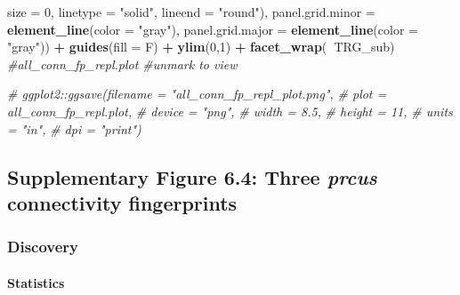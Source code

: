 \documentclass[
]{article}
\newenvironment{Shaded}{\begin{snugshade}}{\end{snugshade}}
\newcommand{\CommentTok}[1]{\textcolor[rgb]{0.56,0.35,0.01}{\textit{#1}}}
\newcommand{\DataTypeTok}[1]{\textcolor[rgb]{0.13,0.29,0.53}{#1}}
\newcommand{\DecValTok}[1]{\textcolor[rgb]{0.00,0.00,0.81}{#1}}
\newcommand{\KeywordTok}[1]{\textcolor[rgb]{0.13,0.29,0.53}{\textbf{#1}}}
\newcommand{\NormalTok}[1]{#1}
\newcommand{\OperatorTok}[1]{\textcolor[rgb]{0.81,0.36,0.00}{\textbf{#1}}}
\newcommand{\StringTok}[1]{\textcolor[rgb]{0.31,0.60,0.02}{#1}}
\begin{document}
\begin{Shaded}
\begin{Highlighting}[]
                                 \DataTypeTok{size =} \DecValTok{0}\NormalTok{, }\DataTypeTok{linetype =} \StringTok{"solid"}\NormalTok{, }\DataTypeTok{lineend =} \StringTok{"round"}\NormalTok{),}
        \DataTypeTok{panel.grid.minor =} \KeywordTok{element_line}\NormalTok{(}\DataTypeTok{color =} \StringTok{"gray"}\NormalTok{), }
        \DataTypeTok{panel.grid.major =} \KeywordTok{element_line}\NormalTok{(}\DataTypeTok{color =} \StringTok{"gray"}\NormalTok{)) }\OperatorTok{+}\StringTok{ }
\StringTok{  }\KeywordTok{guides}\NormalTok{(}\DataTypeTok{fill =}\NormalTok{ F) }\OperatorTok{+}\StringTok{ }
\StringTok{  }\KeywordTok{ylim}\NormalTok{(}\DecValTok{0}\NormalTok{,}\DecValTok{1}\NormalTok{) }\OperatorTok{+}\StringTok{ }
\StringTok{  }\KeywordTok{facet_wrap}\NormalTok{(}\OperatorTok{~}\NormalTok{TRG_sub)}
\CommentTok{#all_conn_fp_repl.plot #unmark to view}

\CommentTok{# ggplot2::ggsave(filename = "all_conn_fp_repl_plot.png",}
\CommentTok{#                 plot = all_conn_fp_repl.plot,}
\CommentTok{#                 device = "png",}
\CommentTok{#                 width = 8.5,}
\CommentTok{#                 height = 11, }
\CommentTok{#                 units = "in",}
\CommentTok{#                 dpi = "print")}
\end{Highlighting}
\end{Shaded}

\hypertarget{supplementary-figure-6.4-three-prcus-connectivity-fingerprints}{%
\subsection{\texorpdfstring{Supplementary Figure 6.4: Three \emph{prcus}
connectivity
fingerprints}{Supplementary Figure 6.4: Three prcus connectivity fingerprints}}\label{supplementary-figure-6.4-three-prcus-connectivity-fingerprints}}

\hypertarget{discovery-1}{%
\subsubsection{Discovery}\label{discovery-1}}

\hypertarget{statistics-1}{%
\paragraph{Statistics}\label{statistics-1}}
\end{document}
